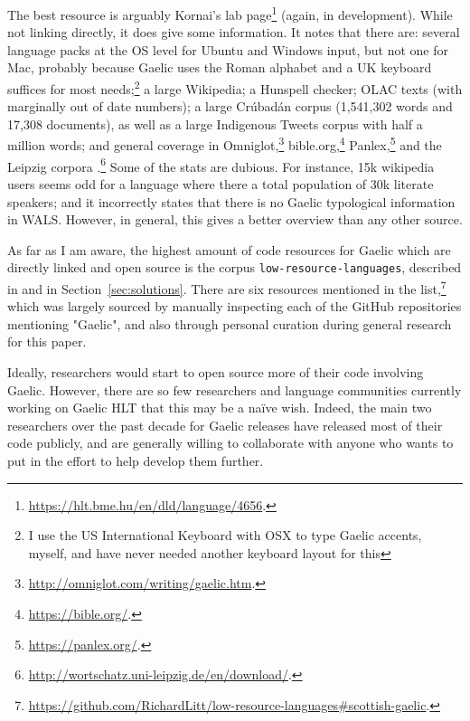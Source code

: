 The best resource is arguably Kornai's lab page\footnote{\href{https://hlt.bme.hu/en/dld/language/4656}{https://hlt.bme.hu/en/dld/language/4656}. } (again, in development). While not linking directly, it does give some information. It notes that there are: several language packs at the OS level for Ubuntu and Windows input, but not one for Mac, probably because Gaelic uses the Roman alphabet and a UK keyboard suffices for most needs;\footnote{I use the US International Keyboard with OSX to type Gaelic accents, myself, and have never needed another keyboard layout for this} a large Wikipedia; a Hunspell checker; OLAC texts (with marginally out of date numbers); a large Cr\'ubad\'an corpus (1,541,302 words and 17,308 documents), as well as a large Indigenous Tweets corpus with half a million words; and general coverage in Omniglot,\footnote{\href{http://omniglot.com/writing/gaelic.htm}{http://omniglot.com/writing/gaelic.htm}. } bible.org,\footnote{\href{https://bible.org/}{https://bible.org/}. } Panlex,\footnote{\href{https://panlex.org/}{https://panlex.org/}. } and the Leipzig corpora \citep{goldhahn2012building}.\footnote{\href{http://wortschatz.uni-leipzig.de/en/download/}{http://wortschatz.uni-leipzig.de/en/download/}. } Some of the stats are dubious. For instance, 15k wikipedia users seems odd for a language where there a total population of 30k literate speakers; and it incorrectly states that there is no Gaelic typological information in WALS. However, in general, this gives a better overview than any other source.

As far as I am aware, the highest amount of code resources for Gaelic which are directly linked and open source is the corpus {\tt low-resource-languages}, described in \citet{CCURL} and in Section~\ref{sec:solutions}. There are six resources mentioned in the list,\footnote{\href{https://github.com/RichardLitt/low-resource-languages\#scottish-gaelic}{https://github.com/RichardLitt/low-resource-languages\#scottish-gaelic}. } which was largely sourced by manually inspecting each of the GitHub repositories mentioning "Gaelic", and also through personal curation during general research for this paper.

Ideally, researchers would start to open source more of their code involving Gaelic. However, there are so few researchers and language communities currently working on Gaelic HLT that this may be a na\"{i}ve wish. Indeed, the main two researchers over the past decade for Gaelic releases have released most of their code publicly, and are generally willing to collaborate with anyone who wants to put in the effort to help develop them further.

